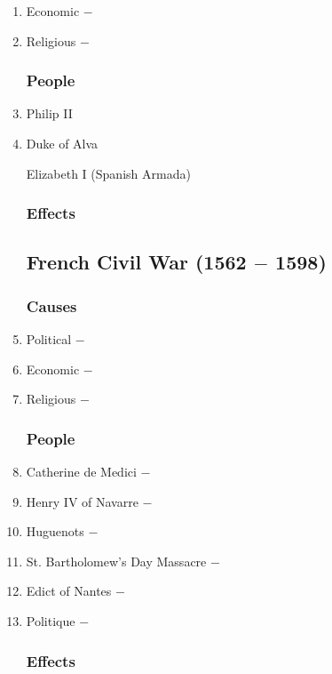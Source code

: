 \documentclass[12pt]{article}
\begin{document}
\begin{enumerate}
\item Economic $-$ 

\item Religious $-$ 

\subsubsection{People}

\item Philip II

\item Duke of Alva

Elizabeth I (Spanish Armada)

\subsubsection{Effects}

\subsection{French Civil War (1562 $-$ 1598)}

\subsubsection{Causes}

\item Political $-$ 

\item Economic $-$

\item Religious $-$ 

\subsubsection{People}

\item Catherine de Medici $-$

\item Henry IV of Navarre $-$ 

\item Huguenots $-$ 

\item St. Bartholomew's Day Massacre $-$

\item Edict of Nantes $-$ 

\item Politique $-$ 

\subsubsection{Effects}


\end{enumerate}
\end{document}
